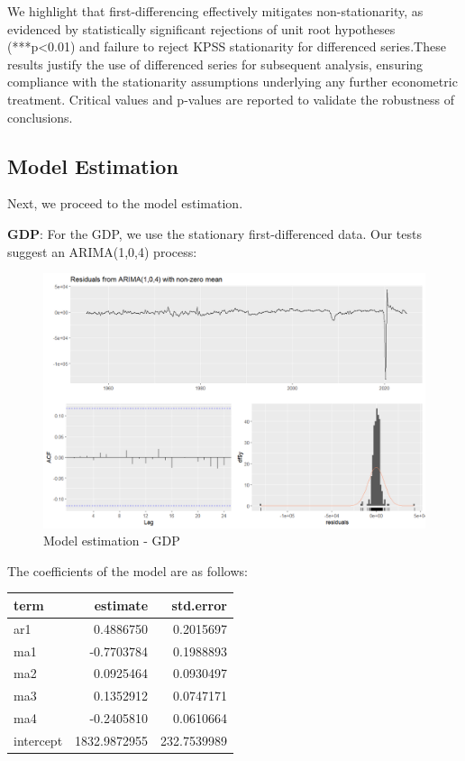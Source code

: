 \documentclass[
]{article}
\begin{document}
We highlight that first-differencing effectively mitigates
non-stationarity, as evidenced by statistically significant rejections of
unit root hypotheses (***p<0.01) and failure to reject KPSS stationarity for 
differenced series.These results justify the use of differenced series for subsequent analysis, 
ensuring compliance with the stationarity assumptions underlying any further 
econometric treatment. Critical values and p-values are reported to validate the robustness
of conclusions.

\subsection{Model Estimation}

Next, we proceed to the model estimation. 

\textbf{GDP}: For the GDP, we use the stationary first-differenced data.
Our tests suggest an ARIMA(1,0,4) process:

\begin{figure}

{\centering \includegraphics[width=0.8\linewidth]{../results/GDP (first-differenced)_residuals} 

}

\caption{Model estimation - GDP}\label{fig:unnamed-chunk-8}
\end{figure}

The coefficients of the model are as follows:

\bgroup \table[H]
\centering
\caption{\label{tab:unnamed-chunk-9}Model coefficients GDP}
\centering
\begin{tabular}[t]{lrr}
\toprule
term & estimate & std.error\\
\midrule
ar1 & 0.4886750 & 0.2015697\\
ma1 & -0.7703784 & 0.1988893\\
ma2 & 0.0925464 & 0.0930497\\
ma3 & 0.1352912 & 0.0747171\\
ma4 & -0.2405810 & 0.0610664\\
\addlinespace
intercept & 1832.9872955 & 232.7539989\\
\bottomrule
\end{tabular}
\endtable\egroup
\end{document}
